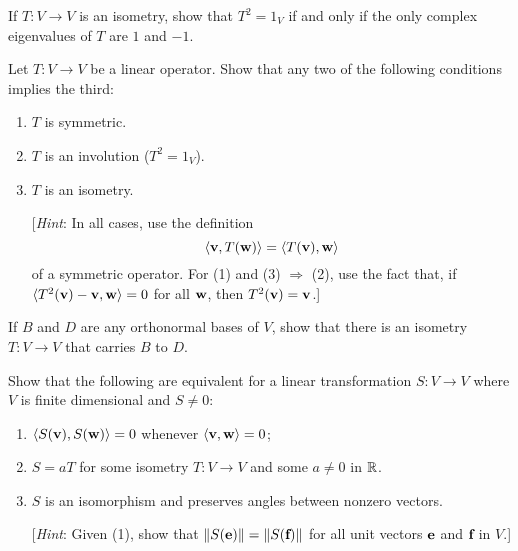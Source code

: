 \begin{multicols}{2}
\begin{ex}
If $T : V \to V$ is an isometry, show that $T^{2} = 1_{V}$ if and only if the only complex eigenvalues of $T$ are $1$ and $-1$.
\end{ex}

\begin{ex}
Let $T : V \to V$ be a linear operator. Show that any two of the following conditions implies the third:

\begin{enumerate}
\item $T$ is symmetric.

\item $T$ is an involution ($T^{2} = 1_{V}$).

\item $T$ is an isometry.

[\textit{Hint}: In all cases, use the definition 
\begin{equation*}
\langle\textbf{v}, T(\textbf{w}) \rangle = \langle  T(\textbf{v}), \textbf{w} \rangle
\end{equation*}
 of a symmetric operator. For (1) and (3) $\Rightarrow$ (2), use the fact that, if $\langle T^{2}(\textbf{v}) - \textbf{v}, \textbf{w} \rangle = 0$ for all $\textbf{w}$, then $T^{2}(\textbf{v}) = \textbf{v}$.]

\end{enumerate}
\end{ex}

\begin{ex}
If $B$ and $D$ are any orthonormal bases of $V$, show that there is an isometry $T : V \to V$ that carries $B$ to $D$.
\end{ex}

\begin{ex}
Show that the following are equivalent for a linear transformation $S : V \to V$ where $V$ is finite dimensional and $S \neq 0$:

\begin{enumerate}
\item $\langle S(\textbf{v}), S(\textbf{w}) \rangle = 0$ whenever $\langle\textbf{v}, \textbf{w} \rangle  = 0$;

\item $S = aT$ for some isometry $T : V \to V$ and some $a \neq 0$ in $\mathbb{R}$.

\item $S$ is an isomorphism and preserves angles between nonzero vectors.

[\textit{Hint}: Given (1), show that $\| S(\textbf{e}) \| = \| S(\textbf{f})\|$ for all unit vectors $\textbf{e}$ and $\textbf{f}$ in $V$.]


\end{enumerate}
\end{ex}
\end{multicols}
